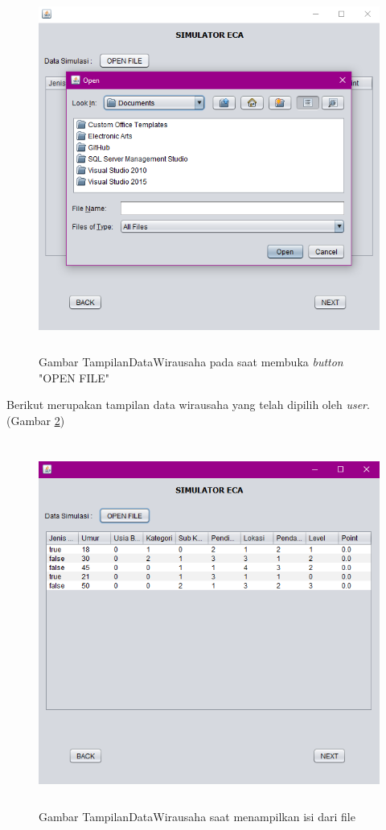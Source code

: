 \begin{enumerate}
		\begin{figure} [H]
	\centering  
	\includegraphics[width=12cm, height=12cm]{tampilanImplementasiData} 
		\caption[Gambar TampilanDataWirausaha]{Gambar TampilanDataWirausaha pada saat membuka \textit{button} "OPEN FILE"}
	\label{fig:tampilandata} 
\end{figure}

Berikut merupakan tampilan data wirausaha yang telah dipilih oleh \textit{user}. (Gambar \ref{fig:tampilandata1})
	
		\begin{figure} [H]
	\centering  
	\includegraphics[width=12cm, height=12cm]{tampilanImplementasiData1} 
		\caption[Gambar TampilanDataWirausaha]{Gambar TampilanDataWirausaha saat menampilkan isi dari file}
	\label{fig:tampilandata1} 
\end{figure}


\end{enumerate}

